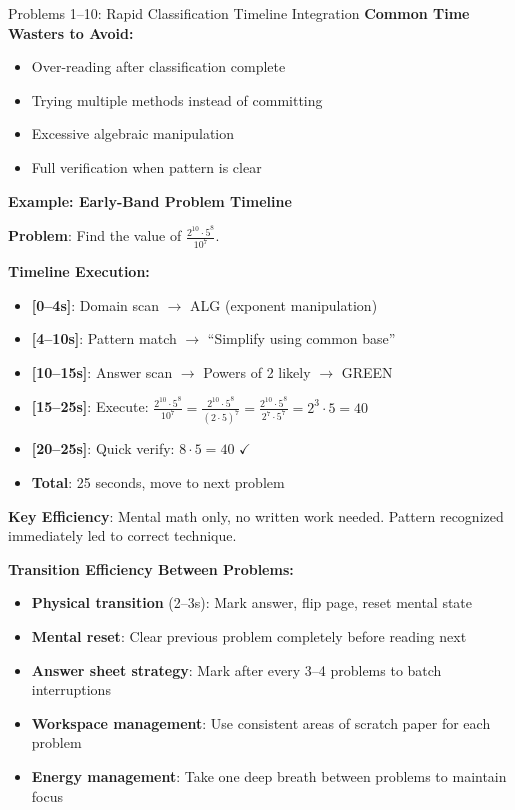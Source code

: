 \documentclass{article}
\begin{document}
\begin{timebox}{Problems 1--10: Rapid Classification Timeline Integration}
\textbf{Common Time Wasters to Avoid:}
\begin{itemize}[nosep]
\item Over-reading after classification complete
\item Trying multiple methods instead of committing
\item Excessive algebraic manipulation
\item Full verification when pattern is clear
\end{itemize}

\textbf{Example: Early-Band Problem Timeline}
\begin{tcolorbox}[colback=green!5!white,colframe=green!50!black]
\textbf{Problem}: Find the value of $\frac{2^{10} \cdot 5^8}{10^7}$.

\textbf{Timeline Execution:}
\begin{itemize}[nosep]
\item \textbf{[0--4s]}: Domain scan $\rightarrow$ ALG (exponent manipulation)
\item \textbf{[4--10s]}: Pattern match $\rightarrow$ ``Simplify using common base''
\item \textbf{[10--15s]}: Answer scan $\rightarrow$ Powers of 2 likely $\rightarrow$ GREEN
\item \textbf{[15--25s]}: Execute: $\frac{2^{10} \cdot 5^8}{10^7} = \frac{2^{10} \cdot 5^8}{(2 \cdot 5)^7} = \frac{2^{10} \cdot 5^8}{2^7 \cdot 5^7} = 2^3 \cdot 5 = 40$
\item \textbf{[20--25s]}: Quick verify: $8 \cdot 5 = 40$ $\checkmark$
\item \textbf{Total}: 25 seconds, move to next problem
\end{itemize}

\textbf{Key Efficiency}: Mental math only, no written work needed. Pattern recognized immediately led to correct technique.
\end{tcolorbox}

\textbf{Transition Efficiency Between Problems:}
\begin{itemize}[nosep]
\item \textbf{Physical transition} (2--3s): Mark answer, flip page, reset mental state
\item \textbf{Mental reset}: Clear previous problem completely before reading next
\item \textbf{Answer sheet strategy}: Mark after every 3--4 problems to batch interruptions
\item \textbf{Workspace management}: Use consistent areas of scratch paper for each problem
\item \textbf{Energy management}: Take one deep breath between problems to maintain focus
\end{itemize}
\end{timebox}
\end{document}
